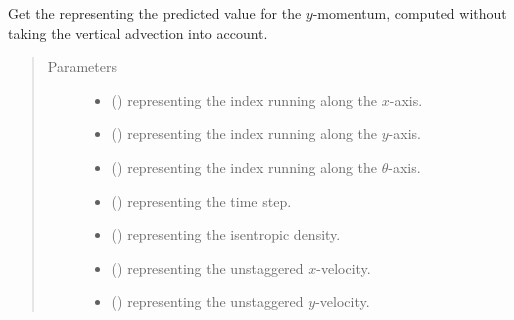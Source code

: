 \documentclass[letterpaper,10pt,english]{sphinxmanual}
\begin{document}
\begin{fulllineitems}

\begin{fulllineitems}
\label{\detokenize{api:dycore.flux_isentropic_maccormack.FluxIsentropicMacCormack._get_maccormack_horizontal_predicted_value_momentum_y}}
Get the  representing the predicted value for the \(y\)-momentum,
computed without taking the vertical advection into account.
\begin{quote}\begin{description}
\item[{Parameters}] \leavevmode\begin{itemize}
\item {} 
 () \textendash{}  representing the index running along the \(x\)-axis.

\item {} 
 () \textendash{}  representing the index running along the \(y\)-axis.

\item {} 
 () \textendash{}  representing the index running along the \(\theta\)-axis.

\item {} 
 () \textendash{}  representing the time step.

\item {} 
 () \textendash{}  representing the isentropic density.

\item {} 
 () \textendash{}  representing the unstaggered \(x\)-velocity.

\item {} 
 () \textendash{}  representing the unstaggered \(y\)-velocity.


\end{itemize}
\end{description}
\end{quote}
\end{fulllineitems}
\end{fulllineitems}
\end{document}
